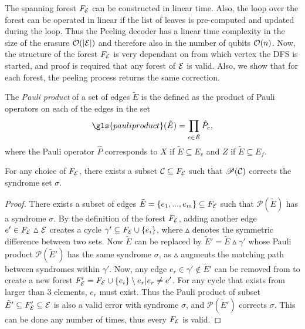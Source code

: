 The spanning forest $F_{\mathcal{E}}$ can be constructed in linear time. Also, the loop over the forest can be operated in linear if the list of leaves is pre-computed and updated during the loop. Thus the Peeling decoder has a linear time complexity in the size of the erasure $\mathcal{O}(\abs{\mathcal{E}})$ and therefore also in the number of qubits $\mathcal{O}(n)$. Now, the structure of the forest $F_{\mathcal{E}}$ is very dependant on from which vertex the DFS is started, and proof is required that any forest of $\mathcal{E}$ is valid. Also, we show that for each forest, the peeling process returns the same correction.
\begin{definition}
  The \emph{Pauli product} of a set of edges $\tilde{E}$ is the defined as the product of Pauli operators on each of the edges in the set
  \begin{equation}
    \gls{pauliproduct}(\tilde{E}) = \prod_{e\in \tilde{E}} \hat{P}_e,
  \end{equation}
  where the Pauli operator $\hat{P}$ corresponds to $X$ if $\tilde{E}\subseteq E_v$ and $Z$ if $\tilde{E}\subseteq E_f$. 
\end{definition}
\begin{lemma}\label{lem:anyforest}
  For any choice of $F_{\mathcal{E}}$, there exists a subset $\mathcal{C}\subseteq F_{\mathcal{E}}$ such that $\mathscr{P}(\mathcal{C})$ corrects the syndrome set $\sigma$.
\end{lemma}
\begin{proof}
  There exists a subset of edges $\tilde{E} = \{e_1,...,e_m\} \subseteq F_{\mathcal{E}}$ such that $\mathscr{P}(\tilde{E})$ has a syndrome $\sigma$. By the definition of the forest $F_{\mathcal{E}}$, adding another edge $e' \in F_{\mathcal{E}} \vartriangle \mathcal{E}$ creates a cycle $\gamma' \subseteq F_{\mathcal{E}} \cup \{e_i\}$, where $\vartriangle$ denotes the symmetric difference between two sets. Now $\tilde{E}$ can be replaced by $\tilde{E}'=\tilde{E}\vartriangle\gamma'$ whose Pauli product $\mathscr{P}(\tilde{E}')$ has the same syndrome $\sigma$, as $\vartriangle$ augments the matching path between syndromes within $\gamma'$. Now, any edge $e_r\in \gamma' \notin \tilde{E}'$ can be removed from to create a new forest $F_{\mathcal{E}}'=F_{\mathcal{E}} \cup \{e_i\}\setminus e_r|e_r \neq e'$. For any cycle that exists from larger than 3 elements, $e_r$ must exist. Thus the Pauli product of subset $\tilde{E}' \subseteq F_{\mathcal{E}}'\subseteq \mathcal{E}$ is also a valid error with syndrome $\sigma$, and $\mathscr{P}(\tilde{E}')$ corrects $\sigma$. This can be done any number of times, thus every $F_{\mathcal{E}}$ is valid.   
\end{proof}
